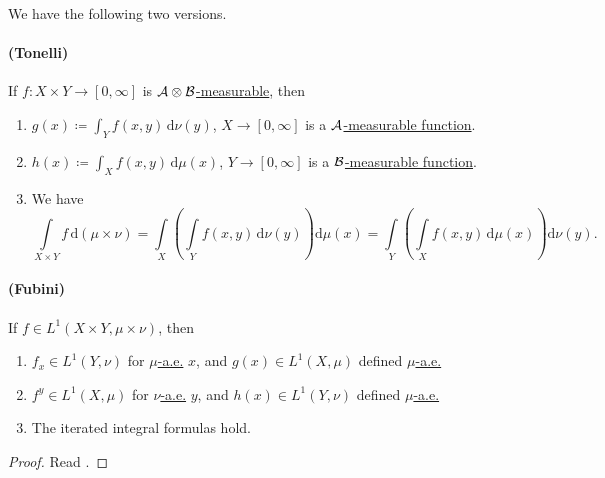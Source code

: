 \begin{theorem}\label{thm:Fubini-Tonelli-theorem}
	We have the following two versions.

	\paragraph{(Tonelli)} If \(f\colon X\times Y\to [0, \infty ]\) is \hyperref[def:A-measurable-function]{\(\mathcal{\MakeUppercase{a}} \otimes \mathcal{\MakeUppercase{b}} \)-measurable},
	then
	\begin{enumerate}
		\item \(g(x)\coloneqq \int_Y f(x, y)\,\mathrm{d} \nu (y)\), \(X\to [0, \infty ]\) is a \hyperref[def:A-measurable-function]{\(\mathcal{\MakeUppercase{a}}\)-measurable function}.
		\item \(h(x)\coloneqq \int_X f(x, y)\,\mathrm{d} \mu (x)\), \(Y\to [0, \infty ]\) is a \hyperref[def:A-measurable-function]{\(\mathcal{\MakeUppercase{b}}\)-measurable function}.
		\item We have
		      \begingroup\makeatletter\def\f@size{8}\check@mathfonts
		      \[
			      \int\limits_{X\times Y} f \,\mathrm{d}(\mu \times \nu ) = \int\limits _X\left(\int\limits _Y f(x, y)\,\mathrm{d}\nu (y)\right)\mathrm{d} \mu (x) = \int\limits _Y\left(\int\limits_X f(x, y)\,\mathrm{d} \mu (x)\right)\mathrm{d} \nu (y).
		      \]
		      \endgroup
	\end{enumerate}

	\paragraph{(Fubini)} If \(f\in L^1(X\times Y, \mu \times \nu )\), then
	\begin{enumerate}
		\item \(f_{x} \in L^1(Y, \nu )\) for \hyperref[def:mu-almost-everywhere]{\(\mu\)-a.e.} \(x\), and \(g(x)\in L^1(X, \mu )\) defined \hyperref[def:mu-almost-everywhere]{\(\mu\)-a.e.}
		\item \(f^{y} \in L^1(X, \mu )\) for \hyperref[def:mu-almost-everywhere]{\(\nu\)-a.e.} \(y\), and \(h(x)\in L^1(Y, \nu )\) defined \hyperref[def:mu-almost-everywhere]{\(\mu\)-a.e.}
		\item The iterated integral formulas hold.
	\end{enumerate}
\end{theorem}
\begin{proof}
	Read \cite{folland1999real}.
\end{proof}
